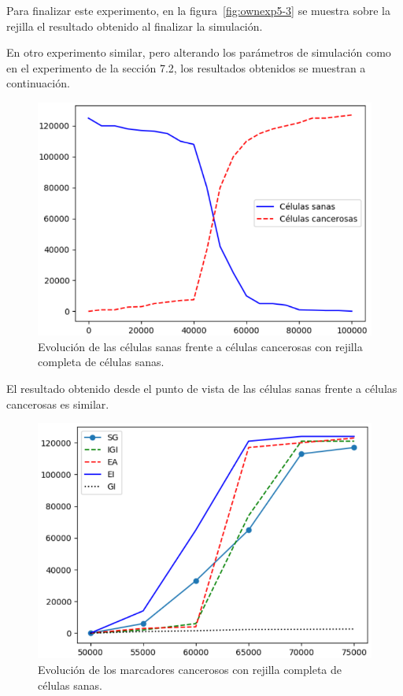 Para finalizar este experimento, en la figura~\ref{fig:ownexp5-3} se muestra sobre la rejilla el resultado
obtenido al finalizar la simulación.

\clearpage

En otro experimento similar, pero alterando los parámetros de simulación como en el experimento de la sección
7.2, los resultados obtenidos se muestran a continuación.

\begin{figure}[h]
\centering
\includegraphics[scale=0.8]{figures/experiments/exp6/healthvscarcino}
\caption{Evolución de las células sanas frente a células cancerosas con rejilla completa de células sanas.}
\label{fig:ownexp6-1}
\end{figure}

El resultado obtenido desde el punto de vista de las células sanas frente a células cancerosas
es similar.

\begin{figure}[h]
\centering
\includegraphics[scale=0.8]{figures/experiments/exp6/mutations}
\caption{Evolución de los marcadores cancerosos con rejilla completa de células sanas.}
\label{fig:ownexp6-2}
\end{figure}

